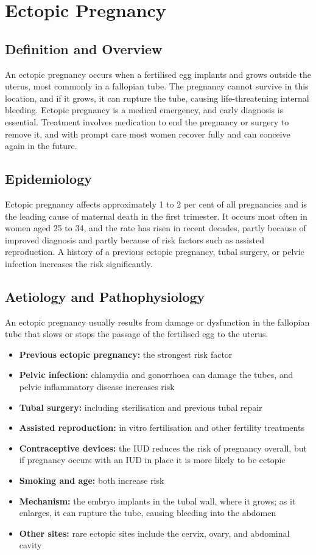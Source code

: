 \chapter{Ectopic Pregnancy}

\section*{Definition and Overview}
An ectopic pregnancy occurs when a fertilised egg implants and grows outside the uterus, most commonly in a fallopian tube. The pregnancy cannot survive in this location, and if it grows, it can rupture the tube, causing life-threatening internal bleeding. Ectopic pregnancy is a medical emergency, and early diagnosis is essential. Treatment involves medication to end the pregnancy or surgery to remove it, and with prompt care most women recover fully and can conceive again in the future.

\section*{Epidemiology}
Ectopic pregnancy affects approximately 1 to 2 per cent of all pregnancies and is the leading cause of maternal death in the first trimester. It occurs most often in women aged 25 to 34, and the rate has risen in recent decades, partly because of improved diagnosis and partly because of risk factors such as assisted reproduction. A history of a previous ectopic pregnancy, tubal surgery, or pelvic infection increases the risk significantly.

\section*{Aetiology and Pathophysiology}
An ectopic pregnancy usually results from damage or dysfunction in the fallopian tube that slows or stops the passage of the fertilised egg to the uterus.
\begin{itemize}
    \item \textbf{Previous ectopic pregnancy:} the strongest risk factor
    \item \textbf{Pelvic infection:} chlamydia and gonorrhoea can damage the tubes, and pelvic inflammatory disease increases risk
    \item \textbf{Tubal surgery:} including sterilisation and previous tubal repair
    \item \textbf{Assisted reproduction:} in vitro fertilisation and other fertility treatments
    \item \textbf{Contraceptive devices:} the IUD reduces the risk of pregnancy overall, but if pregnancy occurs with an IUD in place it is more likely to be ectopic
    \item \textbf{Smoking and age:} both increase risk
    \item \textbf{Mechanism:} the embryo implants in the tubal wall, where it grows; as it enlarges, it can rupture the tube, causing bleeding into the abdomen
    \item \textbf{Other sites:} rare ectopic sites include the cervix, ovary, and abdominal cavity
\end{itemize}

